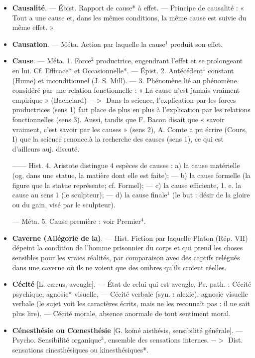 \begin{itemize}[leftmargin=1cm, label=, itemsep=11pt]
\item {\bf Causalité}. — Ébist. Rapport de cause*
à effet. — Principe de causalité :
« Tout a une cause et, dans les
mêmes conditions, la même cause
est suivie du même effet. »

\item {\bf Causation}. — Méta. Action par laquelle la cause$^1$ produit son effet.

\item {\bf Cause}. — Méta. 1. Force$^2$ productrice,
engendrant l'effet et se prolongeant
en lui. Cf. Efficace* et Occasionnelle*. — Épist. 2. Antécédent$^1$
constant (Hume) et inconditionnel
(J. S. Mill). — 3. Phénomène lié au
phénomène considéré par une relation fonctionnelle : « La cause n’est
jamais vraiment empirique » (Bachelard) $->$ Dans la science, l'explication par les forces productrices
(sens 1) fait place de plus en plus à
l’explication par les relations fonctionnelles (sens 3). Aussi, tandis
que F. Bacon disait que « savoir
vraiment, c’est savoir par les causes »
(sens 2), A. Comte a pu écrire
(Cours, I) que la science renonce.à
la recherche des causes (sens 1), ce
qui est d'ailleurs auj. discuté.

—— Hist. 4. Aristote distingue
4 espèces de causes : a) la cause matérielle (og, dans une statue, la
matière dont elle est faite); — b) la
cause formelle (la figure que la statue
représente; cf. Formel); — c) la
cause efficiente, 1. e. la cause au sens 1
(le sculpteur); — d) la cause finale$^1$
(le but : désir de la gloire ou du gain,
visé par le sculpteur).

— Méta. 5. Cause première : voir
Premier$^4$.

\item {\bf Caverne (Allégorie de la)}. — Hist.
Fiction par laquelle Platon (Rép.
VII) dépeint la condition de l’homme
prisonnier du corps et qui prend les
%
choses sensibles pour les vraies réalités, par comparaison avec des
captifs relégués dans une caverne
où ils ne voient que des ombres
qu'ils croient réelles.

\item {\bf Cécité} [L. cæcus, aveugle]. — État
de celui qui est aveugle, Ps. path. :
Cécité psychique, agnosie* visuelle,
— Cécité verbale (syn. : alexie),
agnosie visuelle verbale (le sujet
voit les caractères écrits, mais ne les
reconnaît pas : il ne sait plus lire).
— Cécité morale, absence anormale
de tout sentiment moral.

\item {\bf Cénesthésie ou Cœnesthésie} [G. koïné
aisthésis, sensibilité générale]. —
Psycho. Sensibilité organique$^3$, ensemble des sensations internes.
$->$ Dist. sensations cinesthésiques
ou kinesthésiques*.


\end{itemize}
